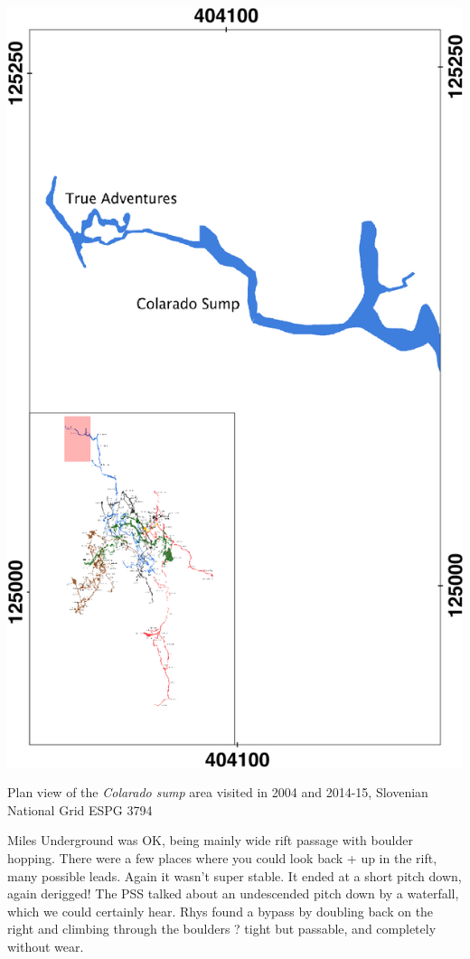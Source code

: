 \begin{marginfigure}
\checkoddpage \ifoddpage \forcerectofloat \else \forceversofloat \fi
\centering
 \includegraphics[width=\linewidth]{images/2014/jarv-2014/colarado_inset}
 \caption{Plan view of the \emph{Colarado sump} area visited in 2004 and 2014-15, Slovenian National Grid ESPG 3794}
 \label{Red Cow inset}
\end{marginfigure}

Miles Underground was OK, being mainly wide rift passage with boulder hopping. There were a few places where you could look back + up in the rift, many possible leads. Again it wasn't super stable. It ended at a short pitch down, again derigged! The PSS talked about an undescended pitch down by a waterfall, which we could certainly hear.
Rhys found a bypass by doubling back on the right and climbing through the boulders ? tight but passable, and completely without wear.



